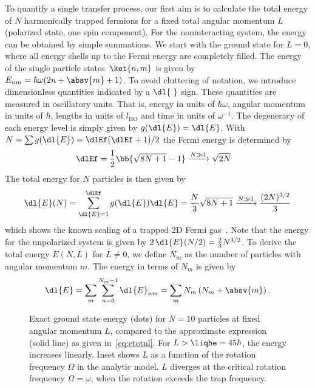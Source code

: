 To quantify a single transfer process, our first aim is to calculate the total energy of $N$ harmonically trapped fermions for a fixed total angular momentum $L$ (polarized state, one spin component). For the noninteracting system, the energy can be obtained by simple summations. We start with the ground state for $L=0$, where all energy shells up to the Fermi energy are completely filled. The energy of the single particle states~$\ket{n,m}$ is given by $E_{nm}=\hbar\omega(2n+\absv{m}+1)$. To avoid cluttering of notation, we introduce dimensionless quantities indicated by a $\dl{\ }$ sign. These quantities are measured in oscillatory units. That is, energy in units of $\hbar\omega$, angular momentum in units of $\hbar$, lengths in units of $l_\text{HO}$ and time in units of $\omega^{-1}$. The degeneracy of each energy level is simply given by $g(\dl{E}) = \dl{E}$.
With $N=\sum g(\dl{E}) = \dlEf(\dlEf+1)/2$ the Fermi energy is determined by
\begin{align*}
\dlEf &= \frac{1}{2}\bb{\sqrt{8N+1}-1} \xrightarrow{N\gg 1} \sqrt{2N}
\end{align*}
The total energy for $N$ particles is then given by
\begin{align} \label{eq:energyzero}
\dl{E}(N) = \sum_{\dl{E}=1}^{\dlEf} g(\dl{E}) \dl{E} = \frac{N}{3} \sqrt{8N+1} \xrightarrow{N\gg 1} \frac{(2N)^{3/2}}{3}
\end{align}
which shows the known scaling of a trapped 2D Fermi gas~\cite{Yoshimoto2003}.
Note that the energy for the unpolarized system is given by $2\,\dl{E}(N/2)=\frac{2}{3} N^{3/2}$.
To derive the total energy $E(N,L)$ for $L\ne 0$, we define $N_m$ as the number of particles with angular momentum $m$. The energy in terms of $N_m$ is given by
\begin{align} \label{eq:energyf}
\dl{E} = \sum_m \sum_{n=0}^{N_m-1} \dl{E}_{nm} = \sum_m N_m\left(N_m + \absv{m} \right).
\end{align}

\begin{figure}[t]
    \centering
    \caption{ Exact ground state energy (dots) for $N=10$ particles at fixed angular momentum $L$, compared to the approximate expression (solid line) as given in~\eqref{eq:etotnl}. For $L>\liqhe=45\hbar$, the energy increases linearly. Inset shows $L$ as a function of the rotation frequency $\Omega$ in the analytic model. $L$ diverges at the critical rotation frequency $\Omega=\omega$, when the rotation exceeds the trap frequency.}
\end{figure}

